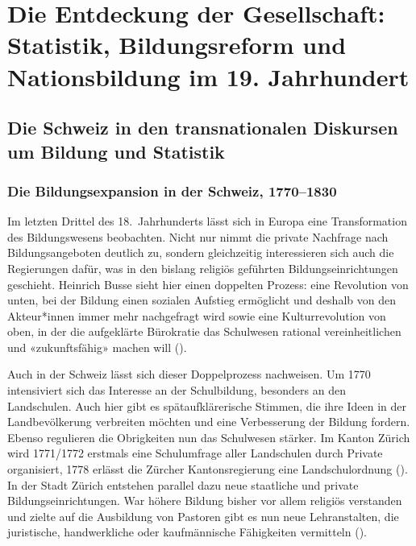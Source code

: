 


\chapter{Die Entdeckung der Gesellschaft: Statistik, Bildungsreform und Nationsbildung im 19. Jahrhundert} %
\label{Chapter2} %


\section{Die Schweiz in den transnationalen Diskursen um Bildung und Statistik}

\subsection{Die Bildungsexpansion in der Schweiz, 1770–1830}

Im letzten Drittel des 18.~Jahrhunderts lässt sich in Europa eine Transformation des Bildungswesens beobachten. Nicht nur nimmt die private Nachfrage nach Bildungsangeboten deutlich zu, sondern gleichzeitig interessieren sich auch die Regierungen dafür, was in den bislang religiös geführten Bildungseinrichtungen geschieht. Heinrich Busse sieht hier einen doppelten Prozess: eine Revolution von unten, bei der Bildung einen sozialen Aufstieg ermöglicht und deshalb von den Akteur*innen immer mehr nachgefragt wird sowie eine Kulturrevolution von oben, in der die aufgeklärte Bürokratie das Schulwesen rational vereinheitlichen und «zukunftsfähig» machen will (\cite[50, 59]{bosse_bildungsrevolution_2012}).  

Auch in der Schweiz lässt sich dieser Doppelprozess nachweisen. Um 1770 intensiviert sich das Interesse an der Schulbildung, besonders an den Landschulen. Auch hier gibt es spätaufklärerische Stimmen, die ihre Ideen in der Landbevölkerung verbreiten möchten und eine Verbesserung der Bildung fordern. Ebenso regulieren die Obrigkeiten nun das Schulwesen stärker. Im Kanton Zürich wird 1771/1772 erstmals eine Schulumfrage aller Landschulen durch Private organisiert, 1778 erlässt die Zürcher Kantonsregierung eine Landschulordnung (\cite[48-63]{bloch_pfister_priester_2007}). In der Stadt Zürich entstehen parallel dazu neue staatliche und private Bildungseinrichtungen. War höhere Bildung bisher vor allem religiös verstanden und zielte auf die Ausbildung von Pastoren gibt es nun neue Lehranstalten, die juristische, handwerkliche oder kaufmännische Fähigkeiten vermitteln (\cite[156-157]{trohler_classical_2011}).

